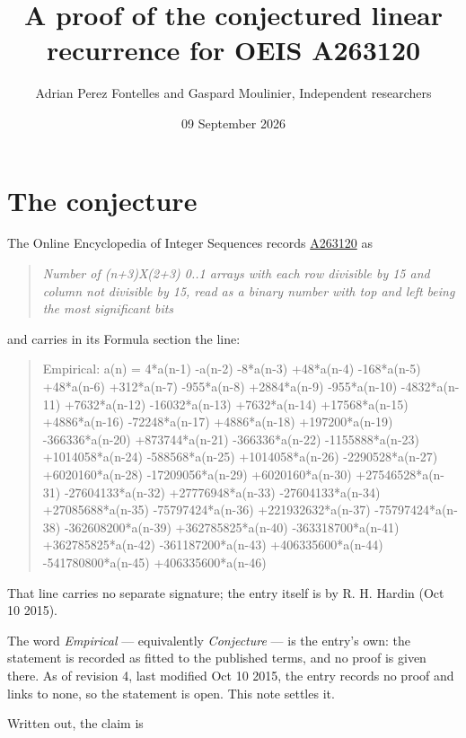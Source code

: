\documentclass[11pt]{article}
\title{A proof of the conjectured linear recurrence for OEIS A263120}
\author{Adrian Perez Fontelles and Gaspard Moulinier, Independent researchers}
\date{09 September 2026}
\theoremstyle{definition}
\begin{document}
\maketitle
\section{The conjecture}

The Online Encyclopedia of Integer Sequences records \href{https://oeis.org/A263120}{A263120} as

\begin{quote}\itshape Number of (n+3)X(2+3) 0..1 arrays with each row divisible by 15 and column not divisible by 15, read as a binary number with top and left being the most significant bits\end{quote}

and carries in its Formula section the line:

\begin{quote}\ttfamily Empirical: a(n) = 4*a(n-1) -a(n-2) -8*a(n-3) +48*a(n-4) -168*a(n-5) +48*a(n-6) +312*a(n-7) -955*a(n-8) +2884*a(n-9) -955*a(n-10) -4832*a(n-11) +7632*a(n-12) -16032*a(n-13) +7632*a(n-14) +17568*a(n-15) +4886*a(n-16) -72248*a(n-17) +4886*a(n-18) +197200*a(n-19) -366336*a(n-20) +873744*a(n-21) -366336*a(n-22) -1155888*a(n-23) +1014058*a(n-24) -588568*a(n-25) +1014058*a(n-26) -2290528*a(n-27) +6020160*a(n-28) -17209056*a(n-29) +6020160*a(n-30) +27546528*a(n-31) -27604133*a(n-32) +27776948*a(n-33) -27604133*a(n-34) +27085688*a(n-35) -75797424*a(n-36) +221932632*a(n-37) -75797424*a(n-38) -362608200*a(n-39) +362785825*a(n-40) -363318700*a(n-41) +362785825*a(n-42) -361187200*a(n-43) +406335600*a(n-44) -541780800*a(n-45) +406335600*a(n-46)\end{quote}

That line carries no separate signature; the entry itself is by R. H. Hardin (Oct 10 2015).

The word {\itshape Empirical} --- equivalently {\itshape Conjecture} --- is the entry's own: the statement is recorded as fitted to the published terms, and no proof is given there. As of revision 4, last modified Oct 10 2015, the entry records no proof and links to none, so the statement is open. This note settles it.

Written out, the claim is
\end{document}
